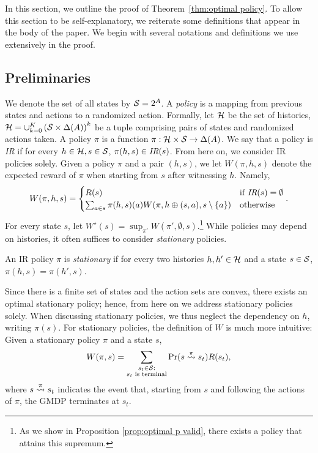 In this section, we outline the proof of Theorem~\ref{thm:optimal policy}. 
To allow this section to be self-explanatory, we reiterate some definitions that appear in the body of the paper. We begin with several notations and definitions we use extensively in the proof.
\subsection{Preliminaries}
We denote the set of all states by $\mathcal{S}=2^A$. A \textit{policy} is a mapping from previous states and actions to a randomized action. Formally, let $\mathcal{H}$ be the set of histories, $\mathcal{H}=\cup_{k=0}^K\left(\mathcal{S} \times \Delta(A)\right)^k$ be a tuple comprising pairs of states and randomized actions taken. A policy $\pi$ is a function $\pi:\mathcal{H} \times \mathcal{S} \rightarrow \Delta(A)$. We say that a policy is \textit{IR} if for every $h\in \mathcal{H},s\in \mathcal{S}$, $\pi(h,s)\in \textit{IR}(s)$. From here on, we consider IR policies solely. Given a policy $\pi$ and a pair $(h,s)$, we let $W(\pi,h,s)$ denote the expected reward of $\pi$ when starting from $s$ after witnessing $h$. Namely,
\begin{align}\label{eq:W elaborated}
W(\pi,h,s) = 
\begin{cases}
R(s) & \textnormal{if }\textit{IR}(s)=\emptyset\\
\sum_{a\in s}\pi(h,s)(a)W(\pi,h\oplus(s,a),s\setminus \{a\}) & \textnormal{otherwise}
\end{cases}.
\end{align}
For every state $s$, let $W^\star(s)=\sup_{\pi'}W(\pi ',\emptyset,s)$.\footnote{As we show in Proposition \ref{prop:optimal p valid}, there exists a policy that attains this supremum.} While policies may depend on histories, it often suffices to consider \emph{stationary} policies.
\begin{definition}[Stationary]
An IR policy $\pi$ is \textit{stationary} if for every two histories $h,h' \in \mathcal{H}$ and a state $s \in \mathcal{S}$, $\pi(h,s)=\pi(h',s)$.
\end{definition}
Since there is a finite set of states and the action sets are convex, there exists %
an optimal stationary policy; hence, from here on we address stationary policies solely. When discussing stationary policies, we thus neglect the dependency on $h$, writing $\pi(s)$. For stationary policies, the definition of $W$ is much more intuitive: Given a stationary policy $\pi$ and a state $s$,
\begin{align}\label{eq:w with terminal}
W(\pi,s)=\sum_{\substack{s_t\in \mathcal{S}:\\ s_t \textnormal{ is terminal}}}\Pr(s\stackrel{\pi}{\rightsquigarrow}s_t)R(s_t),
\end{align}
where $s\stackrel{\pi}{\rightsquigarrow}s_t$ indicates the event that, starting from $s$ and following the actions of $\pi$, the GMDP terminates at $s_t$. 

